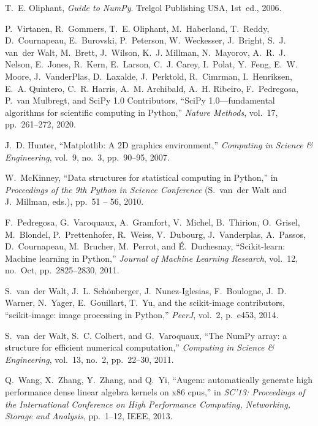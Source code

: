 \documentclass[twocolumn]{article}
\begin{document}
\begin{thebibliography}{10}
T.~E. Oliphant, {\em Guide to {NumPy}}.
\newblock Trelgol Publishing USA, 1st~ed., 2006.

P.~Virtanen, R.~Gommers, T.~E. Oliphant, M.~Haberland, T.~Reddy, D.~Cournapeau,
  E.~Burovski, P.~Peterson, W.~Weckesser, J.~Bright, S.~J. van~der Walt,
  M.~Brett, J.~Wilson, K.~J. Millman, N.~Mayorov, A.~R.~J. Nelson, E.~Jones,
  R.~Kern, E.~Larson, C.~J. Carey, I.~Polat, Y.~Feng, E.~W. Moore,
  J.~VanderPlas, D.~Laxalde, J.~Perktold, R.~Cimrman, I.~Henriksen, E.~A.
  Quintero, C.~R. Harris, A.~M. Archibald, A.~H. Ribeiro, F.~Pedregosa, P.~van
  Mulbregt, and {SciPy 1.0 Contributors}, ``{SciPy} 1.0---fundamental
  algorithms for scientific computing in {Python},'' {\em Nature Methods},
  vol.~17, pp.~261--272, 2020.

J.~D. Hunter, ``Matplotlib: A {2D} graphics environment,'' {\em Computing in
  Science \& Engineering}, vol.~9, no.~3, pp.~90--95, 2007.

W.~McKinney, ``Data structures for statistical computing in {Python},'' in {\em
  Proceedings of the 9th Python in Science Conference} (S.~van~der Walt and
  J.~Millman, eds.), pp.~51 -- 56, 2010.

F.~Pedregosa, G.~Varoquaux, A.~Gramfort, V.~Michel, B.~Thirion, O.~Grisel,
  M.~Blondel, P.~Prettenhofer, R.~Weiss, V.~Dubourg, J.~Vanderplas, A.~Passos,
  D.~Cournapeau, M.~Brucher, M.~Perrot, and {\'E}.~Duchesnay, ``Scikit-learn:
  Machine learning in {P}ython,'' {\em Journal of Machine Learning Research},
  vol.~12, no.~Oct, pp.~2825--2830, 2011.

S.~van~der Walt, J.~L. Sch{\"o}nberger, J.~Nunez-Iglesias, F.~Boulogne, J.~D.
  Warner, N.~Yager, E.~Gouillart, T.~Yu, and {the scikit-image contributors},
  ``{scikit-image}: image processing in {P}ython,'' {\em PeerJ}, vol.~2,
  p.~e453, 2014.

S.~van~der Walt, S.~C. Colbert, and G.~Varoquaux, ``The {NumPy} array: a
  structure for efficient numerical computation,'' {\em Computing in Science \&
  Engineering}, vol.~13, no.~2, pp.~22--30, 2011.

Q.~Wang, X.~Zhang, Y.~Zhang, and Q.~Yi, ``Augem: automatically generate high
  performance dense linear algebra kernels on x86 cpus,'' in {\em SC'13:
  Proceedings of the International Conference on High Performance Computing,
  Networking, Storage and Analysis}, pp.~1--12, IEEE, 2013.


\end{thebibliography}
\end{document}
